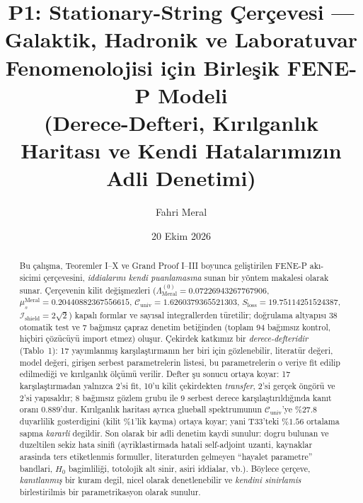 \documentclass[12pt,a4paper]{article}
\title{\textbf{P1: Stationary-String Çerçevesi --- Galaktik, Hadronik ve Laboratuvar Fenomenolojisi için Birleşik FENE-P Modeli} \\[0.3cm]
\large (Derece-Defteri, Kırılganlık Haritası ve Kendi Hatalarımızın Adli Denetimi)}
\author{Fahri Meral}
\date{20 Ekim 2026}
\begin{document}
\shorthandoff{=}

\maketitle

\begin{abstract}
Bu çalışma, Teoremler I--X ve Grand Proof I--III boyunca geliştirilen
FENE-P akı-sicimi çerçevesini, \emph{iddialarını kendi puanlamasına} sunan
bir yöntem makalesi olarak sunar. Çerçevenin kilit değişmezleri
($\Lambda_{\mathrm{Meral}}^{(0)} = 0.07226943267767906$,
$\mu_s^{\mathrm{Meral}} = 0.20440882367556615$,
$\mathcal{C}_{\mathrm{univ}} = 1.6260379365521303$,
$S_{\mathrm{loss}} = 19.75114251524387$,
$\mathcal{I}_{\mathrm{shield}} = 2\sqrt{2}$) kapalı formlar ve sayısal
integrallerden türetilir; doğrulama altyapısı 38 otomatik test ve 7 bağımsız
çapraz denetim betiğinden (toplam 94 bağımsız kontrol, hiçbiri çözücüyü
import etmez) oluşur. Çekirdek katkımız bir \emph{derece-defteridir}
(Tablo~1): 17 yayımlanmış karşılaştırmanın her biri için gözlenebilir,
literatür değeri, model değeri, girişen serbest parametrelerin listesi, bu
parametrelerin o veriye fit edilip edilmediği ve kırılganlık ölçümü
verilir. Defter şu sonucu ortaya koyar: 17 karşılaştırmadan yalnızca
2'si fit, 10'u kilit çekirdekten \emph{transfer}, 2'si gerçek öngörü ve
2'si yapısaldır; 8 bağımsız gözlem grubu ile 9 serbest derece
karşılaştırıldığında kanıt oranı $0.889$'dur. Kırılganlık haritası ayrıca
glueball spektrumunun $\mathcal{C}_{\mathrm{univ}}$'ye $\%27.8$
duyarlilik gosterdigini (kilit $\%1$'lik kayma) ortaya koyar; yani
T33'teki $\%1.56$ ortalama sapma \emph{kararli} degildir. Son olarak bir
adli denetim kaydi sunulur: dogru bulunan ve duzeltilen sekiz hata sinifi
(ayriklastirmada hatali self-adjoint uzanti, kaynaklar arasinda ters
etiketlenmis formuller, literaturden gelmeyen ``hayalet parametre''
bandlari, $H_0$ bagimliliği, totolojik alt sinir, asiri iddialar, vb.).
Böylece çerçeve, \emph{kanıtlanmış} bir kuram degil, nicel olarak
denetlenebilir ve \emph{kendini sinirlamis} birlestirilmis bir
parametrikasyon olarak sunulur.
\end{abstract}
\end{document}
